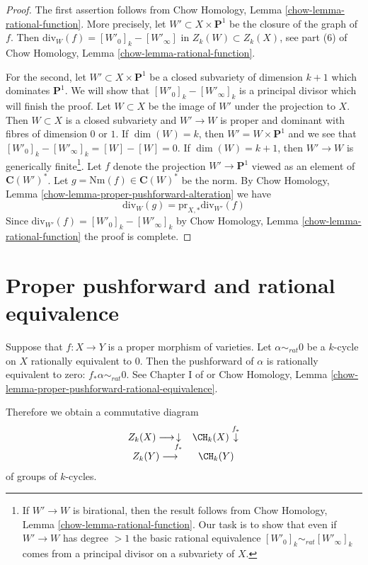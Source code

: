 \begin{proof}
The first assertion follows from
Chow Homology, Lemma \ref{chow-lemma-rational-function}.
More precisely, let $W' \subset X \times \mathbf{P}^1$ be the closure
of the graph of $f$. Then $\text{div}_W(f) = [W'_0]_k - [W'_\infty]$
in $Z_k(W) \subset Z_k(X)$, see part (6) of
Chow Homology, Lemma \ref{chow-lemma-rational-function}.

\medskip\noindent
For the second, let $W' \subset X \times \mathbf{P}^1$ be a closed
subvariety of dimension $k + 1$ which dominates $\mathbf{P}^1$.
We will show that $[W'_0]_k - [W'_\infty]_k$ is a principal divisor
which will finish the proof. Let $W \subset X$ be the image of $W'$
under the projection to $X$. Then $W \subset X$ is a closed subvariety
and $W' \to W$ is proper and dominant with fibres of dimension $0$
or $1$. If $\dim(W) = k$, then $W' = W \times \mathbf{P}^1$ and we
see that $[W'_0]_k - [W'_\infty]_k = [W] - [W] = 0$.
If $\dim(W) = k + 1$, then
$W' \to W$ is generically finite\footnote{If $W' \to W$ is birational,
then the result follows from
Chow Homology, Lemma \ref{chow-lemma-rational-function}.
Our task is to show that even if $W' \to W$
has degree $> 1$ the basic rational equivalence
$[W'_0]_k \sim_{rat} [W'_\infty]_k$ comes from a principal divisor
on a subvariety of $X$.}. Let $f$ denote the projection $W' \to \mathbf{P}^1$
viewed as an element of $\mathbf{C}(W')^*$. Let
$g = \text{Nm}(f) \in \mathbf{C}(W)^*$ be the norm. By
Chow Homology, Lemma \ref{chow-lemma-proper-pushforward-alteration}
we have
$$
\text{div}_W(g) = \text{pr}_{X, *}\text{div}_{W'}(f)
$$
Since $\text{div}_{W'}(f) = [W'_0]_k - [W'_\infty]_k$
by Chow Homology, Lemma \ref{chow-lemma-rational-function}
the proof is complete.
\end{proof}

\section{Proper pushforward and rational equivalence}
\label{intersection-section-pushforward-and-rational-equivalence}
Suppose that $f : X \to Y$ is a proper morphism of varieties.
Let $\alpha \sim_{rat} 0$ be a $k$-cycle on
$X$ rationally equivalent to $0$. Then the {pushforward}
of $\alpha$ is rationally equivalent to zero:
$f_* \alpha \sim_{rat} 0$. See Chapter I of \cite{F} or
Chow Homology, Lemma \ref{chow-lemma-proper-pushforward-rational-equivalence}.

\medskip\noindent
Therefore we obtain a commutative diagram
$$
\begin{array}{cc}Z_k(X) \longrightarrow\underset{f_*}{\downarrow} & \CH_k(X) \overset{f_*}{\downarrow} \\ Z_k(Y) \longrightarrow & \CH_k(Y)\end{array}
$$
of groups of $k$-cycles.


